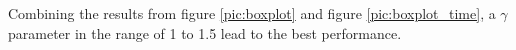 Combining the results from figure \ref{pic:boxplot} and figure \ref{pic:boxplot_time}, a $\gamma$ parameter in the range of 1 to 1.5 lead to the best performance.











%

